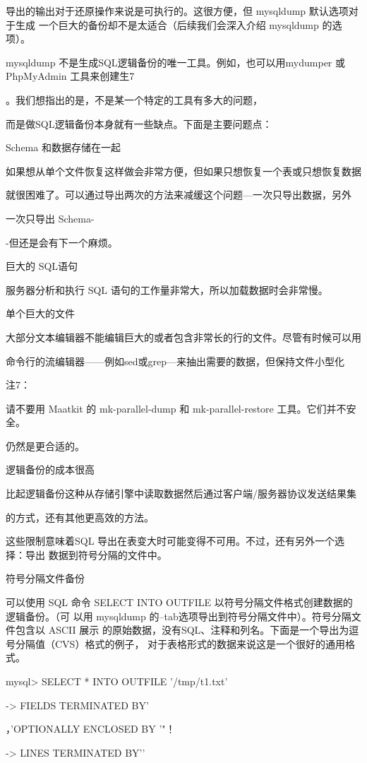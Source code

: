 导出的输出对于还原操作来说是可执行的。这很方便，但 mysqldump 默认选项对于生成
一个巨大的备份却不是太适合（后续我们会深入介绍 mysqldump 的选项）。

mysqldump 不是生成SQL逻辑备份的唯一工具。例如，也可以用mydumper 或
PhpMyAdmin 工具来创建生7

。我们想指出的是，不是某一个特定的工具有多大的问题，

而是做SQL逻辑备份本身就有一些缺点。下面是主要问题点：

Schema 和数据存储在一起

如果想从单个文件恢复这样做会非常方便，但如果只想恢复一个表或只想恢复数据

就很困难了。可以通过导出两次的方法来减缓这个问题—一次只导出数据，另外

一次只导出 Schema-

-但还是会有下一个麻烦。

巨大的 SQL语句

服务器分析和执行 SQL 语句的工作量非常大，所以加载数据时会非常慢。

单个巨大的文件

大部分文本编辑器不能编辑巨大的或者包含非常长的行的文件。尽管有时候可以用

命令行的流编辑器——例如sed或grep—来抽出需要的数据，但保持文件小型化

注7：

请不要用 Maatkit 的 mk-parallel-dump 和 mk-parallel-restore 工具。它们并不安全。

仍然是更合适的。

逻辑备份的成本很高

比起逻辑备份这种从存储引擎中读取数据然后通过客户端/服务器协议发送结果集

的方式，还有其他更高效的方法。

这些限制意味着SQL 导出在表变大时可能变得不可用。不过，还有另外一个选择：导出
数据到符号分隔的文件中。

符号分隔文件备份

可以使用 SQL 命令 SELECT INTO OUTFILE 以符号分隔文件格式创建数据的逻辑备份。（可
以用 mysqldump 的--tab选项导出到符号分隔文件中）。符号分隔文件包含以 ASCII 展示
的原始数据，没有SQL、注释和列名。下面是一个导出为逗号分隔值（CVS）格式的例子，
对于表格形式的数据来说这是一个很好的通用格式。

mysql> SELECT * INTO OUTFILE '/tmp/t1.txt'

-> FIELDS TERMINATED BY'

，'OPTIONALLY ENCLOSED BY '"！

-> LINES TERMINATED BY'\n'

